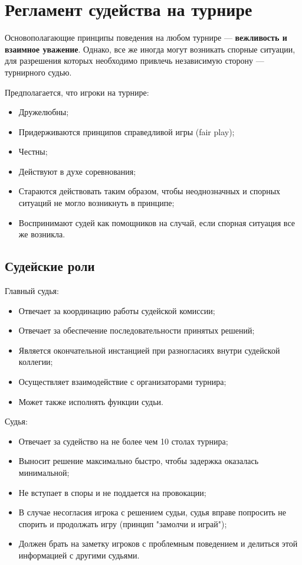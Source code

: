 \section{Регламент судейства на турнире}

Основополагающие принципы поведения на любом турнире --- \textbf{вежливость и взаимное уважение}. Однако, все же иногда могут возникать спорные ситуации, для разрешения которых необходимо привлечь независимую сторону --- турнирного судью.

Предполагается, что игроки на турнире:
\begin{itemize}
	\item Дружелюбны;
	\item Придерживаются принципов справедливой игры (fair play);
	\item Честны;
	\item Действуют в духе соревнования;
	\item Стараются действовать таким образом, чтобы неоднозначных и спорных ситуаций не могло возникнуть в принципе;
	\item Воспринимают судей как помощников на случай, если спорная ситуация все же возникла.
\end{itemize}

\subsection{Судейские роли}

Главный судья:
\begin{itemize}
	\item Отвечает за координацию работы судейской комиссии;
	\item Отвечает за обеспечение последовательности принятых решений;
	\item Является окончательной инстанцией при разногласиях внутри судейской коллегии;
	\item Осуществляет взаимодействие с организаторами турнира;
	\item Может также исполнять функции судьи.
\end{itemize}

Судья:
\begin{itemize}
	\item Отвечает за судейство на не более чем 10 столах турнира;
	\item Выносит решение максимально быстро, чтобы задержка оказалась минимальной;
	\item Не вступает в споры и не поддается на провокации;
	\item В случае несогласия игрока с решением судьи, судья вправе попросить не спорить и продолжать игру (принцип "замолчи и играй");
	\item Должен брать на заметку игроков с проблемным поведением и делиться этой информацией с другими судьями.
\end{itemize}

